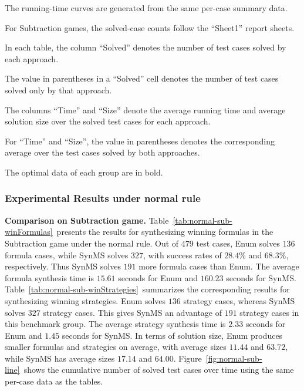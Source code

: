 \documentclass[review]{elsarticle}
\begin{document}
The running-time curves are generated from the same per-case summary data.

For Subtraction games, the solved-case counts follow the ``Sheet1'' report sheets.

In each table, the column ``Solved'' denotes the number of test cases solved by each approach.

The value in parentheses in a ``Solved'' cell denotes the number of test cases solved only by that approach.

The columns ``Time'' and ``Size'' denote the average running time and average solution size over the solved test cases for each approach.

For ``Time'' and ``Size'', the value in parentheses denotes the corresponding average over the test cases solved by both approaches.

The optimal data of each group are in bold.

\subsubsection{Experimental Results under normal rule}

\textbf{Comparison on Subtraction game.}
Table~\ref{tab:normal-sub-winFormulas}~presents the results for synthesizing winning formulas in the Subtraction game under the normal rule.
Out of $479$ test cases, Enum solves $136$ formula cases, while SynMS solves $327$, with success rates of $28.4\%$ and $68.3\%$, respectively.
Thus SynMS solves $191$ more formula cases than Enum.
The average formula synthesis time is $15.61$ seconds for Enum and $160.23$ seconds for SynMS.
Table~\ref{tab:normal-sub-winStrategies}~summarizes the corresponding results for synthesizing winning strategies.
Enum solves $136$ strategy cases, whereas SynMS solves $327$ strategy cases.
This gives SynMS an advantage of $191$ strategy cases in this benchmark group.
The average strategy synthesis time is $2.33$ seconds for Enum and $1.45$ seconds for SynMS.
In terms of solution size, Enum produces smaller formulas and strategies on average, with average sizes $11.44$ and $63.72$, while SynMS has average sizes $17.14$ and $64.00$.
Figure~\ref{fig:normal-sub-line}~shows the cumulative number of solved test cases over time using the same per-case data as the tables.
\end{document}
